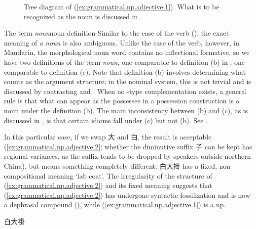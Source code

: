 \documentclass[UTF8, a4paper, oneside, scheme=plain, 12pt]{ctexrep}
\newcommand*{\term}[1]{\emph{#1}}
\newcommand{\translate}[1]{`#1'}
\begin{document}
\begin{figure}[H]
    \centering
    {
        \small
        
    }
    \caption{Tree diagram of (\ref{ex:grammatical.np.adjective.1}).
    What is to be recognized as the noun is discussed in .}
    \label{fig:grammatical.np.adjective.1}
\end{figure}

\begin{theorybox}{The term \term{noun}}{noun-definition}
    Similar to the case of the verb (),
    the exact meaning of \term{a noun} is also ambiguous.
    Unlike the case of the verb, however,
    in Mandarin, the morphological noun word contains no inflectional formative,
    so we have two definitions of the term \term{noun},
    one comparable to definition (b) in ,
    one comparable to definition (c).
    Note that definition (b) involves determining what counts as the argument structure;
    in the nominal system, this is not trivial
    and is discussed by contrasting 
    and .
    When no -type complementation exists,
    a general rule is that what can appear as the possessee in a possession construction
    is a noun under the definition (b).
    The main inconsistency between (b) and (c), as is discussed in ,
    is that certain idioms fall under (c) but not (b).
    See .
\end{theorybox}

In this particular case, 
if we swap 大 and 白, the result is acceptable (\ref{ex:grammatical.np.adjective.2};
whether the diminutive suffix 子 can be kept has regional variances,
as the suffix tends to be dropped by speakers outside northern China),
but means something completely different:
白大褂 has a fixed, non-compositional meaning \translate{lab coat}.
The irregularity of the structure of (\ref{ex:grammatical.np.adjective.2})
and its fixed meaning suggests that (\ref{ex:grammatical.np.adjective.2}) has undergone syntactic fossilization
and is now a dephrasal compound (),
while (\ref{ex:grammatical.np.adjective.1}) is a \ac{np}.

\begin{exe}
    \ex\label{ex:grammatical.np.adjective.2} 白大褂
\end{exe}
\end{document}
